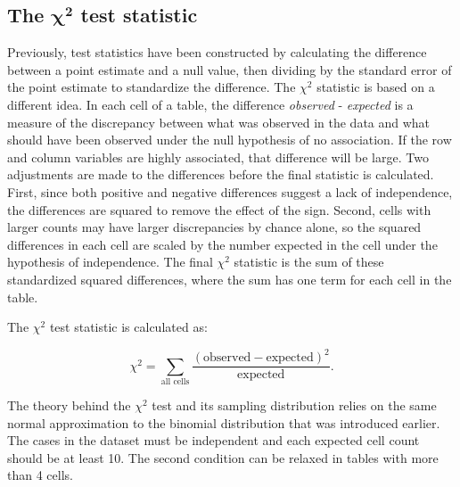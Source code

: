

\textD{\newpage}


\subsection{The $\pmb{\chi^2}$ test statistic}
\label{theChiSquaredTestStatistic}

Previously, test statistics have been constructed by calculating the difference between a point estimate and a null value, then dividing by the standard error of the point estimate to standardize the difference. The $\chi^2$ statistic is based on a different idea.  In each cell of a table, the difference \emph{observed} - \emph{expected} is a measure of the discrepancy between what was observed in the data and what should have been observed under the null hypothesis of no association. If the row and column variables are highly associated, that difference will be large.  Two adjustments are made to the differences before the final statistic is calculated.  First, since both positive and negative differences suggest a lack of independence, the differences are squared to remove the effect of the sign.  Second, cells with larger counts may have larger discrepancies by chance alone, so the squared differences in each cell are scaled by the number expected in the cell under the hypothesis of independence.  The final $\chi^2$ statistic is the sum of these standardized squared differences, where the sum has one term for each cell in the table.

The $\chi^2$ test statistic is calculated as:

\[\chi^2 = \sum_{\text{all cells}} \frac{(\text{observed} - \text{expected})^2}{\text{expected}}. \]

The theory behind the $\chi^2$ test and its sampling distribution relies on the same normal approximation to the binomial distribution that was introduced earlier.  The cases in the dataset must be independent and each expected cell count should be at least 10.  The second condition can be relaxed in tables with more than 4 cells.

